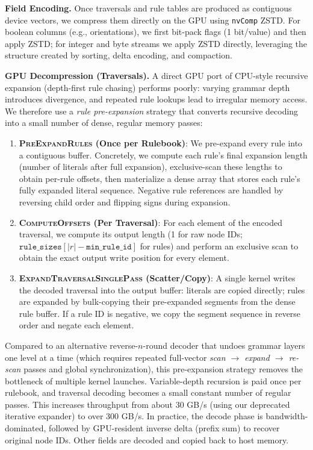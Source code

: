 \noindent \textbf{Field Encoding.}
Once traversals and rule tables are produced as contiguous device vectors, we compress them directly on the GPU using \texttt{nvComp} ZSTD. For boolean columns (e.g., orientations), we first bit-pack flags (1 bit/value) and then apply ZSTD; for integer and byte streams we apply ZSTD directly, leveraging the structure created by sorting, delta encoding, and compaction.




\noindent \textbf{GPU Decompression (Traversals).}
A direct GPU port of CPU-style recursive expansion (depth-first rule chasing) performs poorly: varying grammar depth introduces divergence, and repeated rule lookups lead to irregular memory access. We therefore use a \emph{rule pre-expansion} strategy that converts recursive decoding into a small number of dense, regular memory passes:
\begin{enumerate}[noitemsep, topsep=2pt, leftmargin=*]
  \item \textbf{\textsc{PreExpandRules} (Once per Rulebook)}: We pre-expand every rule into a contiguous buffer. Concretely, we compute each rule's final expansion length (number of literals after full expansion), exclusive-scan these lengths to obtain per-rule offsets, then materialize a dense array that stores each rule's fully expanded literal sequence. Negative rule references are handled by reversing child order and flipping signs during expansion.
  \item \textbf{\textsc{ComputeOffsets} (Per Traversal)}: For each element of the encoded traversal, we compute its output length (1 for raw node IDs; $\texttt{rule\_sizes}[|r|-\texttt{min\_rule\_id}]$ for rules) and perform an exclusive scan to obtain the exact output write position for every element.
  \item \textbf{\textsc{ExpandTraversalSinglePass} (Scatter/Copy)}: A single kernel writes the decoded traversal into the output buffer: literals are copied directly; rules are expanded by bulk-copying their pre-expanded segments from the dense rule buffer. If a rule ID is negative, we copy the segment sequence in reverse order and negate each element.
\end{enumerate}

Compared to an alternative reverse-\(n\)-round decoder that undoes grammar layers one level at a time (which requires repeated full-vector \emph{scan $\rightarrow$ expand $\rightarrow$ re-scan} passes and global synchronization), this pre-expansion strategy removes the bottleneck of multiple kernel launches. Variable-depth recursion is paid once per rulebook, and traversal decoding becomes a small constant number of regular passes. This increases throughput from about 30 GB/s (using our deprecated iterative expander) to over 300 GB/s. In practice, the decode phase is bandwidth-dominated, followed by GPU-resident inverse delta (prefix sum) to recover original node IDs. Other fields are decoded and copied back to host memory.
